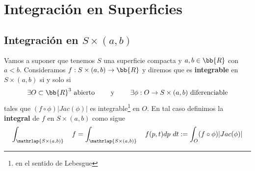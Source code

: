 \section{Integración en Superficies}

\subsection{Integración en $S\times(a,b)$}

\begin{definicion}
    Vamos a suponer que tenemos $S$ una superficie compacta y $a,b\in \bb{R}$ con $a<b$. Consideramos $f:S\times (a,b)\to \bb{R}$ y diremos que es \textbf{integrable} en $S\times (a,b)$ si y solo si
    \begin{gather*}
        \exists O \subset \bb{R}^3 \text{ abierto} \qquad \text{ y } \qquad \exists \phi : O \to S\times (a,b) \text{ diferenciable}
    \end{gather*}
    tales que $(f \circ \phi)|Jac(\phi)|$ es integrable\footnote{en el sentido de Lebesgue} en $O$. En tal caso definimos la \textbf{integral} de $f$ en $S\times(a,b)$ como sigue
    \begin{gather*}
        \int_{\mathrlap{S\times(a,b)}} \quad f = \int_{\mathrlap{S\times(a,b)}}\quad f(p,t) dp\ dt := \int_O (f\circ \phi) |Jac(\phi)|
    \end{gather*}
\end{definicion}

